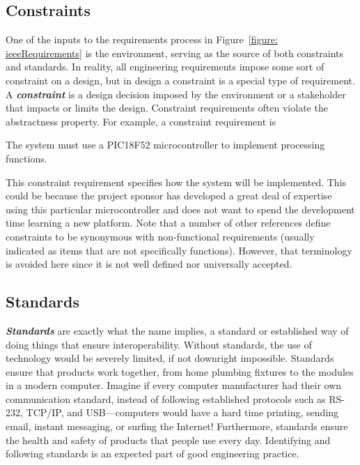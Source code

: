 \subsection{Constraints}
\label{section:constraints}

One of the inputs to the requirements process in Figure~\ref{figure: ieeeRequirements}
is the environment, serving as the source of both constraints and standards. In
reality, all engineering requirements impose some sort of constraint on
a design, but in design a constraint is a special type of requirement. A
\emph{\textbf{constraint}} is a design decision imposed by the
environment or a stakeholder that impacts or limits the design.
Constraint requirements often violate the abstractness property. For
example, a constraint requirement is

\begin{itquote}
The system must use a PIC18F52 microcontroller to implement
processing functions.
\end{itquote}

This constraint requirement specifies how the system will be
implemented. This could be because the project sponsor has developed a
great deal of expertise using this particular microcontroller and does
not want to spend the development time learning a new platform. Note
that a number of other references define constraints to be synonymous
with non-functional requirements (usually indicated as items that are
not specifically functions). However, that terminology is avoided here
since it is not well defined nor universally accepted.

\subsection{Standards}
\label{section:standards}

\emph{\textbf{Standards}} are exactly what the name implies, a standard
or established way of doing things that ensure interoperability. Without
standards, the use of technology would be severely limited, if not
downright impossible. Standards ensure that products work together, from
home plumbing fixtures to the modules in a modern computer. Imagine if
every computer manufacturer had their own communication standard,
instead of following established protocols such as RS-232, TCP/IP, and
USB---computers would have a hard time printing, sending email, instant
messaging, or surfing the Internet! Furthermore, standards ensure the
health and safety of products that people use every day. Identifying and
following standards is an expected part of good engineering practice.

